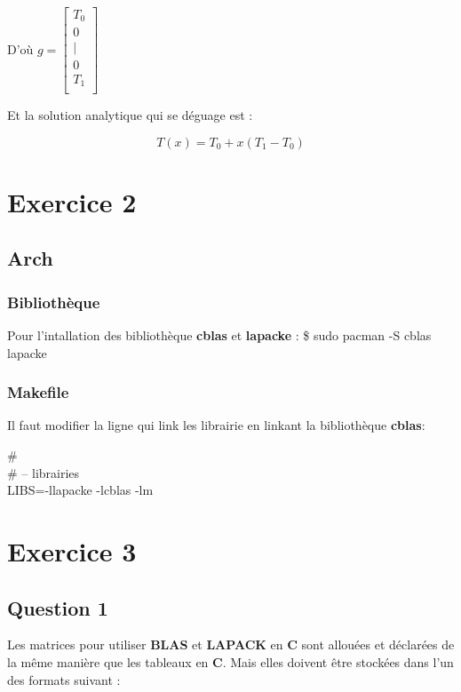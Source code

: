 \documentclass[11pt]{article}
\begin{document}
D'où $g = \left[
  \begin{array}{c}
    T_0 \\
    0 \\
    | \\
    0 \\
    T_1 \\
  \end{array}
  \right]$

Et la solution analytique qui se déguage est : 

$$ T(x) = T_0 + x (T_1 - T_0) $$

\section{Exercice 2}
\subsection{Arch}
\subsubsection{Bibliothèque}

Pour l'intallation des bibliothèque \textbf{cblas} et \textbf{lapacke}
:
\newline
\$ sudo pacman -S cblas lapacke

\subsubsection{Makefile}

Il faut modifier la ligne qui link les librairie en linkant la
bibliothèque \textbf{cblas}:

\# \\
\# -- librairies \\
LIBS=-llapacke -lcblas -lm \\

\section{Exercice 3}
\subsection{Question 1}

Les matrices pour utiliser \textbf{BLAS} et \textbf{LAPACK} en \textbf{C} sont allouées
et déclarées de la même manière que les tableaux en \textbf{C}. Mais elles
doivent être stockées dans l'un des formats suivant :
\end{document}
